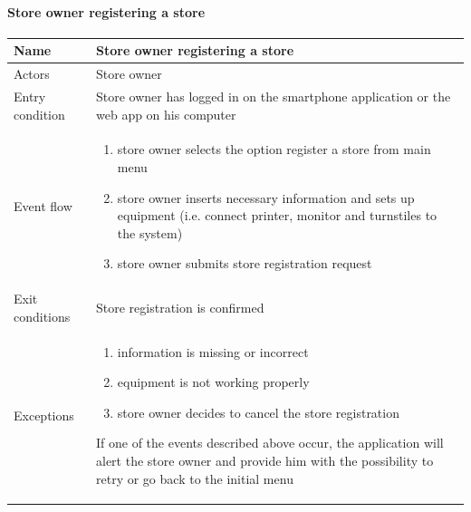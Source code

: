 \paragraph{Store owner registering a store}
\begin{flushleft}
	\begin{tabular} { | m{3cm} | m{10cm} | }
		\hline
		Name & Store owner registering a store\\
		\hline
		Actors & Store owner\\
		\hline
		Entry condition & Store owner has logged in on the smartphone application or the web app on his computer\\
		\hline
		Event flow & \begin{enumerate}
			\item store owner selects the option register a store from main menu
			\item store owner inserts necessary information and sets up equipment (i.e. connect printer, monitor and turnstiles to the system)
			\item store owner submits store registration request
		\end{enumerate}\\
		\hline
		Exit conditions & Store registration is confirmed\\
		\hline
		Exceptions & \begin{enumerate}
			\item information is missing or incorrect
			\item equipment is not working properly			\item store owner decides to cancel the store registration
		\end{enumerate}
		If one of the events described above occur, the application will alert the store owner and provide him with the possibility to retry or go back to the initial menu\\
		\hline
	\end{tabular}
\end{flushleft}

